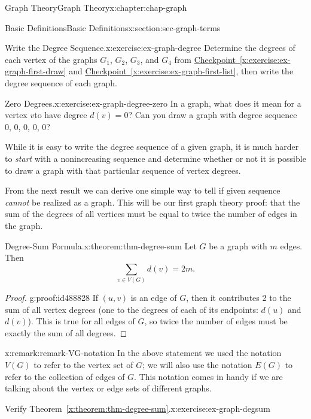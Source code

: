 \documentclass[oneside,10pt,]{book}
\newcommand{\xreffont}{\relax}
\numberwithin{equation}{section}
\begin{document}
\begin{chapterptx}{Graph Theory}{}{Graph Theory}{}{}{x:chapter:chap-graph}
\begin{sectionptx}{Basic Definitions}{}{Basic Definitions}{}{}{x:section:sec-graph-terms}
\begin{inlineexercise}{Write the Degree Sequence.}{x:exercise:ex-graph-degree}
Determine the degrees of each vertex of the graphs \(G_1\), \(G_2\), \(G_3\), and \(G_4\) from \hyperref[x:exercise:ex-graph-first-draw]{Checkpoint~{\xreffont\ref{x:exercise:ex-graph-first-draw}}} and \hyperref[x:exercise:ex-graph-first-list]{Checkpoint~{\xreffont\ref{x:exercise:ex-graph-first-list}}}, then write the degree sequence of each graph.%
\end{inlineexercise}
\begin{inlineexercise}{Zero Degrees.}{x:exercise:ex-graph-degree-zero}%
In a graph, what does it mean for a vertex \(v\)to have degree \(d(v) = 0\)? Can you draw a graph with degree sequence 0, 0, 0, 0, 0?%
\end{inlineexercise}
While it is easy to write the degree sequence of a given graph, it is much harder to \emph{start} with a nonincreasing sequence and determine whether or not it is possible to draw a graph with that particular sequence of vertex degrees.%
\par
From the next result we can derive one simple way to tell if given sequence \emph{cannot} be realized as a graph. This will be our first graph theory proof: that the sum of the degrees of all vertices must be equal to twice the number of edges in the graph.%
\begin{theorem}{Degree-Sum Formula.}{}{x:theorem:thm-degree-sum}%
Let \(G\) be a graph with \(m\) edges. Then%
\begin{equation*}
\sum_{v \in V(G)} d(v) = 2m\text{.}
\end{equation*}
%
\end{theorem}
\begin{proof}{}{g:proof:id488828}
If \((u,v)\) is an edge of \(G\), then it contributes 2 to the sum of all vertex degrees (one to the degrees of each of its endpoints: \(d(u)\) and \(d(v)\)). This is true for all edges of \(G\), so twice the number of edges must be exactly the sum of all degrees.%
\end{proof}
\begin{remark}{}{x:remark:remark-VG-notation}%
In the above statement we used the notation \(V(G)\) to refer to the vertex set of \(G\); we will also use the notation \(E(G)\) to refer to the collection of edges of \(G\). This notation comes in handy if we are talking about the vertex or edge sets of different graphs. \label{g:notation:id488857}\label{g:notation:id488865}%
\end{remark}
\begin{inlineexercise}{Verify Theorem~{\xreffont\ref*{x:theorem:thm-degree-sum}}.}{x:exercise:ex-graph-degsum}%

\end{inlineexercise}
\end{sectionptx}
\end{chapterptx}
\end{document}
